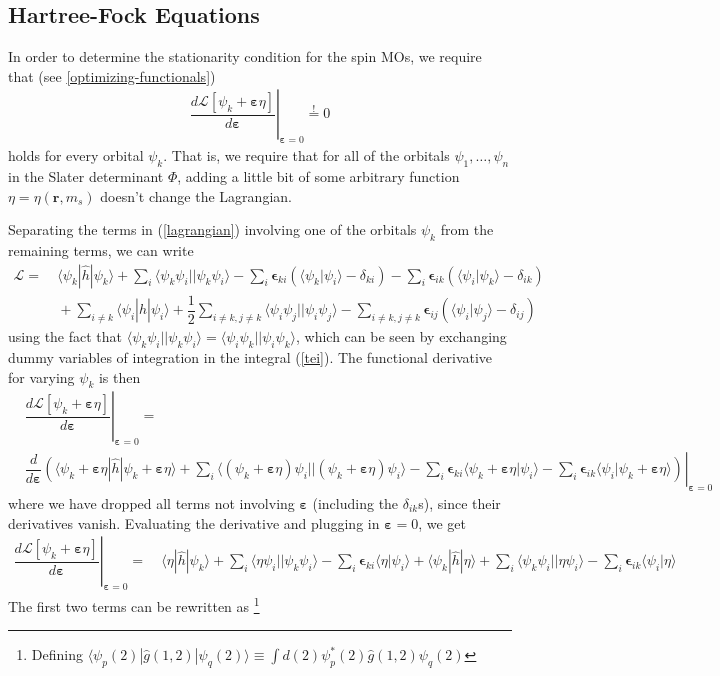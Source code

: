 \documentclass[11pt]{article}
\newcommand{\F}{\ensuremath{\Phi}}
\newcommand{\y}{\ensuremath{\psi}}
\newcommand{\eps}{\ensuremath{\bm\epsilon}}
\newcommand{\e}{\ensuremath{\bm{\varepsilon}}}
\renewcommand{\d}{\ensuremath{\delta}}
\newcommand{\op}[1]{\ensuremath{ \hat{#1} } }
\newcommand{\ld}{\ensuremath{\ldots}}
\newcommand{\mc}[1]{\ensuremath{\mathcal{#1}}}
\newcommand{\bo}[1]{\ensuremath{\mathbf{#1}}}
\newcommand{\pr}[2]{\ensuremath{\left( #2 \right)^{#1}}}
\newcommand{\fr}[2]{\ensuremath{ \dfrac{#1}{#2} }}
\newcommand{\ip}[1]{\ensuremath{\langle #1\rangle}}
\theoremstyle{indented}
\begin{document}
\subsection*{Hartree-Fock Equations}
In order to determine the stationarity condition for the spin MOs, we require that (see \ref{optimizing-functionals})
\begin{align}
\left.
	\fr{d\mc{L}[\y_k+\e \eta]}{d\e}
\right|_{\e=0}
\overset{!}=
	0
\end{align}
holds for every orbital $\y_k$.
That is, we require that for all of the orbitals $\y_1,\ld,\y_n$ in the Slater determinant $\F$, adding a little bit of some arbitrary function $\eta=\eta(\bo{r},m_s)$ doesn't change the Lagrangian.

Separating the terms in (\ref{lagrangian}) involving one of the orbitals $\y_k$ from the remaining terms, we can write
\begin{align*}
	\mc{L}
=&\
	\ip{\y_k|\op{h}|\y_k}
+\sum_i
	\ip{\y_k\y_i||\y_k\y_i}
-\sum_i
	\eps_{ki}(\ip{\y_k|\y_i}-\d_{ki})
-\sum_i
	\eps_{ik}(\ip{\y_i|\y_k}-\d_{ik})
\\&\
+\sum_{i\neq k}
	\ip{\y_i|\op{h}|\y_i}
+\fr{1}{2}\sum_{i\neq k,j\neq k}
	\ip{\y_i\y_j||\y_i\y_j}
-\sum_{i\neq k,j\neq k}
	\eps_{ij}(\ip{\y_i|\y_j}-\d_{ij})
\end{align*}
using the fact that $\ip{\y_k\y_i||\y_k\y_i}=\ip{\y_i\y_k||\y_i\y_k}$, which can be seen by exchanging dummy variables of integration in the integral (\ref{tei}).
The functional derivative for varying $\y_k$ is then
\begin{align*}
&\left.
	\fr{d\mc{L}[\y_k+\e \eta]}{d\e}
\right|_{\e=0}
= \\
&
\left.
\fr{d}{d\e}\pr{}{
	\ip{\y_k+\e\eta|\op{h}|\y_k+\e\eta}
+\sum_i
	\ip{(\y_k+\e\eta)\y_i||(\y_k+\e\eta)\y_i}
-\sum_i
	\eps_{ki}\ip{\y_k+\e\eta|\y_i}
-\sum_i
	\eps_{ik}\ip{\y_i|\y_k+\e\eta}	   }
\right|_{\e=0}
\end{align*}
where we have dropped all terms not involving $\e$ (including the $\d_{ik}$s), since their derivatives vanish.
Evaluating the derivative and plugging in $\e=0$, we get
\begin{align*}
\left.
	\fr{d\mc{L}[\y_k+\e \eta]}{d\e}
\right|_{\e=0}
=&\
	\ip{\eta|\op{h}|\y_k}
+\sum_i
	\ip{\eta\y_i||\y_k\y_i}
-\sum_i
	\eps_{ki}
	\ip{\eta|\y_i}
+
	\ip{\y_k|\op{h}|\eta}
+\sum_i
	\ip{\y_k\y_i||\eta\y_i}
-\sum_i
	\eps_{ik}
	\ip{\y_i|\eta}
\end{align*}
The first two terms can be rewritten as \footnote{Defining $\ip{\y_p(2)|\op{g}(1,2)|\y_q(2)}\equiv\int d(2) \y_p^*(2)\op{g}(1,2)\y_q(2)$}
\end{document}
